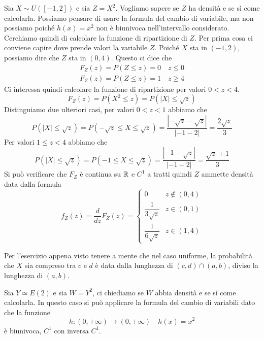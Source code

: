 \begin{example}
	Sia $X \sim U([-1, 2])$ e sia $Z = X^2$. Vogliamo sapere se $Z$ ha densità e se sì come
	calcolarla. Possiamo pensare di usare la formula del cambio di variabile, ma non possiamo
	poiché $h(x) = x^2$ non è biunivoca nell'intervallo considerato. Cerchiamo quindi di calcolare
	la funzione di ripartizione di $Z$. Per prima cosa ci conviene capire dove prende valori la
	variabile $Z$. Poiché $X$ sta in $(-1, 2)$, possiamo dire che $Z$ sta in $(0,4)$. Questo ci
	dice che
	\begin{gather*}
		F_Z(z) = P(Z \leq z) = 0 \quad z \leq 0 \\
		F_Z(z) = P(Z \leq z) = 1 \quad z \geq 4
	\end{gather*}
	Ci interessa quindi calcolare la funzione di ripartizione per valori $0 < z < 4$.
	\[ F_Z(z) = P(X^2 \leq z) = P(|X| \leq \sqrt{z}) \]
	Distinguiamo due ulteriori casi, per valori $0 < z < 1$ abbiamo che
	\[
		P(|X| \leq \sqrt{z}) = P(-\sqrt{z} \leq X \leq \sqrt{z}) =
		\frac{|-\sqrt{z} - \sqrt{z}|}{|-1 - 2|} = \frac{2 \sqrt{z}}{3}
	\]
	Per valori $1 \leq z < 4$ abbiamo che
	\[
		P(|X| \leq \sqrt{z}) = P(-1 \leq X \leq \sqrt{z}) =
		\frac{|-1 - \sqrt{z}|}{|-1 - 2|} = \frac{\sqrt{z} + 1}{3}
	\]
	Si può verificare che $F_Z$ è continua su $\mathbb{R}$ e $C^1$ a tratti quindi $Z$ ammette densità data
	dalla formula
	\[
		f_Z (z) = \frac{d}{dz} F_Z(z) = \begin{cases}
			0                     & z \notin (0,4) \\[1ex]
			\dfrac{1}{3 \sqrt{z}} & z \in (0,1)    \\[2ex]
			\dfrac{1}{6 \sqrt{z}} & z \in (1, 4)
		\end{cases}
	\]
\end{example}

Per l'esercizio appena visto tenere a mente che nel caso uniforme, la probabilità che $X$ sia
compreso tra $c$ e $d$ è data dalla lunghezza di $(c,d) \cap (a,b)$, diviso la lunghezza di $(a,b)$.

\begin{example}
	Sia $Y \simeq E(2)$ e sia $W = Y^2$, ci chiediamo se $W$ abbia densità e se sì come calcolarla.
	In questo caso si può applicare la formula del cambio di variabili dato che la funzione
	\[ h : (0, +\infty) \to (0, +\infty) \quad h(x) = x^2 \]
	è biunivoca, $C^1$ con inversa $C^1$.
\end{example}

